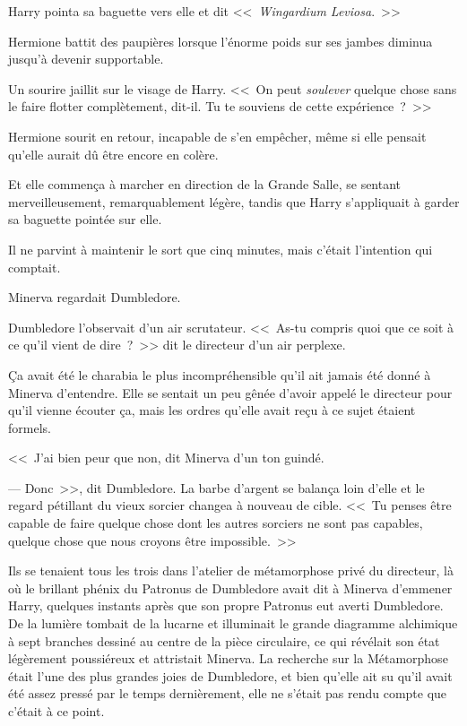 Harry pointa sa baguette vers elle et dit <<~\emph{Wingardium Leviosa}.~>>

Hermione battit des paupières lorsque l'énorme poids sur ses jambes diminua jusqu'à devenir supportable.

Un sourire jaillit sur le visage de Harry. <<~On peut \emph{soulever} quelque chose sans le faire flotter complètement, dit-il. Tu te souviens de cette expérience~?~>>

Hermione sourit en retour, incapable de s'en empêcher, même si elle pensait qu'elle aurait dû être encore en colère.

Et elle commença à marcher en direction de la Grande Salle, se sentant merveilleusement, remarquablement légère, tandis que Harry s'appliquait à garder sa baguette pointée sur elle.

Il ne parvint à maintenir le sort que cinq minutes, mais c'était l'intention qui comptait.

\later

Minerva regardait Dumbledore.

Dumbledore l'observait d'un air scrutateur. <<~As-tu compris quoi que ce soit à ce qu'il vient de dire~?~>> dit le directeur d'un air perplexe.

Ça avait été le charabia le plus incompréhensible qu'il ait jamais été donné à Minerva d'entendre. Elle se sentait un peu gênée d'avoir appelé le directeur pour qu'il vienne écouter ça, mais les ordres qu'elle avait reçu à ce sujet étaient formels.

<<~J'ai bien peur que non, dit Minerva d'un ton guindé.

--- Donc~>>, dit Dumbledore. La barbe d'argent se balança loin d'elle et le regard pétillant du vieux sorcier changea à nouveau de cible. <<~Tu penses être capable de faire quelque chose dont les autres sorciers ne sont pas capables, quelque chose que nous croyons être impossible.~>>

Ils se tenaient tous les trois dans l'atelier de métamorphose privé du directeur, là où le brillant phénix du Patronus de Dumbledore avait dit à Minerva d'emmener Harry, quelques instants après que son propre Patronus eut averti Dumbledore. De la lumière tombait de la lucarne et illuminait le grande diagramme alchimique à sept branches dessiné au centre de la pièce circulaire, ce qui révélait son état légèrement poussiéreux et attristait Minerva. La recherche sur la Métamorphose était l'une des plus grandes joies de Dumbledore, et bien qu'elle ait su qu'il avait été assez pressé par le temps dernièrement, elle ne s'était pas rendu compte que c'était à ce point.

